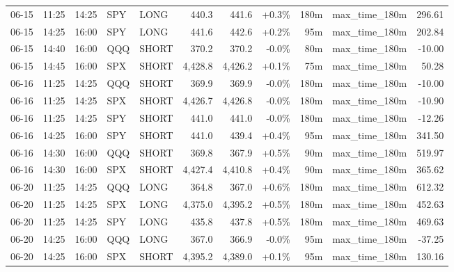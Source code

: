 \documentclass[11pt,a4paper,twoside]{article}
\begin{document}
\begin{center}
\begin{longtable}{>{\color{txtmain}}l l l l l r r r r >{\color{txtmain}}l r}
06-15 & 11:25 & 14:25 & SPY & LONG & 440.3 & 441.6 & \textcolor{wingreen}{+0.3\%} & 180m & max\_time\_180m & \textcolor{wingreen}{296.61} \\
06-15 & 14:25 & 16:00 & SPY & LONG & 441.6 & 442.6 & \textcolor{wingreen}{+0.2\%} & 95m & max\_time\_180m & \textcolor{wingreen}{202.84} \\
06-15 & 14:40 & 16:00 & QQQ & SHORT & 370.2 & 370.2 & \textcolor{wingreen}{-0.0\%} & 80m & max\_time\_180m & \textcolor{lossred}{-10.00} \\
06-15 & 14:45 & 16:00 & SPX & SHORT & 4,428.8 & 4,426.2 & \textcolor{wingreen}{+0.1\%} & 75m & max\_time\_180m & \textcolor{wingreen}{50.28} \\
06-16 & 11:25 & 14:25 & QQQ & SHORT & 369.9 & 369.9 & \textcolor{wingreen}{-0.0\%} & 180m & max\_time\_180m & \textcolor{lossred}{-10.00} \\
06-16 & 11:25 & 14:25 & SPX & SHORT & 4,426.7 & 4,426.8 & \textcolor{lossred}{-0.0\%} & 180m & max\_time\_180m & \textcolor{lossred}{-10.90} \\
06-16 & 11:25 & 14:25 & SPY & SHORT & 441.0 & 441.0 & \textcolor{lossred}{-0.0\%} & 180m & max\_time\_180m & \textcolor{lossred}{-12.26} \\
06-16 & 14:25 & 16:00 & SPY & SHORT & 441.0 & 439.4 & \textcolor{wingreen}{+0.4\%} & 95m & max\_time\_180m & \textcolor{wingreen}{341.50} \\
06-16 & 14:30 & 16:00 & QQQ & SHORT & 369.8 & 367.9 & \textcolor{wingreen}{+0.5\%} & 90m & max\_time\_180m & \textcolor{wingreen}{519.97} \\
06-16 & 14:30 & 16:00 & SPX & SHORT & 4,427.4 & 4,410.8 & \textcolor{wingreen}{+0.4\%} & 90m & max\_time\_180m & \textcolor{wingreen}{365.62} \\
06-20 & 11:25 & 14:25 & QQQ & LONG & 364.8 & 367.0 & \textcolor{wingreen}{+0.6\%} & 180m & max\_time\_180m & \textcolor{wingreen}{612.32} \\
06-20 & 11:25 & 14:25 & SPX & LONG & 4,375.0 & 4,395.2 & \textcolor{wingreen}{+0.5\%} & 180m & max\_time\_180m & \textcolor{wingreen}{452.63} \\
06-20 & 11:25 & 14:25 & SPY & LONG & 435.8 & 437.8 & \textcolor{wingreen}{+0.5\%} & 180m & max\_time\_180m & \textcolor{wingreen}{469.63} \\
06-20 & 14:25 & 16:00 & QQQ & LONG & 367.0 & 366.9 & \textcolor{lossred}{-0.0\%} & 95m & max\_time\_180m & \textcolor{lossred}{-37.25} \\
06-20 & 14:25 & 16:00 & SPX & SHORT & 4,395.2 & 4,389.0 & \textcolor{wingreen}{+0.1\%} & 95m & max\_time\_180m & \textcolor{wingreen}{130.16} \\

\end{longtable}
\end{center}
\end{document}
